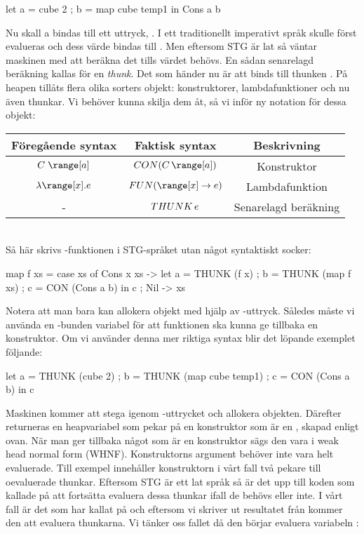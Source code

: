 \documentclass[../Core]{subfiles}
\begin{document}
\begin{codeEx}
let { a = cube 2
    ; b = map cube temp1
    } in Cons a b
\end{codeEx}

Nu skall a bindas till ett uttryck, . I ett traditionellt imperativt språk skulle
 först evalueras och dess värde bindas till . Men eftersom STG
är lat så väntar maskinen med att beräkna det tills värdet behövs.
En sådan senarelagd beräkning kallas för en \emph{thunk}. Det som händer nu är att
 binds till thunken . På heapen tillåts flera olika
sorters objekt: konstruktorer, lambdafunktioner och nu även thunkar.
Vi behöver kunna skilja dem åt, så vi inför ny notation för dessa objekt: \\[0.5cm]
\begin{tabular}{ccc}
Föregående syntax & Faktisk syntax & Beskrivning\tabularnewline
\hline
$C\;\range[a]$ & $\CON C{\range[a]}$ & Konstruktor\tabularnewline
$\lambda\range[x].e$ & $\FUN{\range[x]}e$ & Lambdafunktion\tabularnewline
- & $THUNK\,e$ & Senarelagd beräkning\tabularnewline
\end{tabular} \\[0.5cm]

Så här skrivs -funktionen i STG-språket utan något syntaktiskt socker:

\begin{codeEx}
map f xs = case xs of
    { Cons x xs -> let { a = THUNK (f x)
                       ; b = THUNK (map f xs)
                       ; c = CON (Cons a b)
                       } in c
    ; Nil       -> xs
    }
\end{codeEx}

Notera att man bara kan allokera objekt med hjälp av -uttryck. Således
måste vi använda en -bunden variabel  för att funktionen ska kunna ge tillbaka en konstruktor.
Om vi använder denna mer riktiga syntax blir det löpande exemplet följande:

\begin{codeEx}
let { a = THUNK (cube 2)
    ; b = THUNK (map cube temp1)
    ; c = CON (Cons a b)
    } in c
\end{codeEx}

Maskinen kommer att stega igenom -uttrycket och allokera objekten.
Därefter returneras en heapvariabel som pekar på en konstruktor
som är en , skapad enligt ovan. När man ger tillbaka något som är
en konstruktor sägs den vara i weak head normal form (WHNF). Konstruktorns
argument behöver inte vara helt evaluerade. Till exempel innehåller konstruktorn i vårt fall
två pekare till oevaluerade thunkar. Eftersom STG är ett
lat språk så är det upp till koden som kallade på  att fortsätta
evaluera dessa thunkar ifall de behövs eller inte. I vårt fall är
det  som har kallat på  och eftersom vi skriver ut resultatet från 
kommer den att evaluera thunkarna. Vi tänker oss fallet då den börjar evaluera variabeln :
\end{document}

